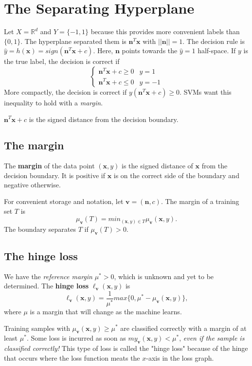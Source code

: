 \documentclass[titlepage, 12pt, leqno]{article}
\begin{document}
\pagebreak
\section{The Separating Hyperplane}
Let $X = \mathbb{R}^{d}$ and $Y = \{-1, 1\}$ because this provides more
convenient labels than $\{0,1\}$. The hyperplane separated them is 
$\textbf{n}^{T}\textbf{x}$ with $||\textbf{n}|| = 1$. The decision rule is
$\hat y = h(\textbf{x}) = sign(\textbf{n}^{T}\textbf{x} + c)$. Here, 
$\textbf{n}$ points towards the $\hat y=1$ half-space. If $y$ is the true
label, the decision is correct if
\[
\begin{cases}
    \textbf{n}^{T}\textbf{x} + c \ge 0 & y=1 \\
    \textbf{n}^{T}\textbf{x} + c \le 0 & y=-1
\end{cases}
\]
More compactly, the decision is correct if $y(\textbf{n}^{T}\textbf{x}+c)\ge 0$.
SVMs want this inequality to hold with a \textit{margin}.
\begin{note}
    $\textbf{n}^{T}\textbf{x} + c$ is the signed distance from the decision
    boundary.
\end{note}

\subsection{The margin}
\begin{definition}
    The \textbf{margin} of the data point $(\textbf{x}, y)$ is the signed
    distance of $\textbf{x}$ from the decision boundary. It is positive if
    $\textbf{x}$ is on the correct side of the boundary and negative otherwise.
\end{definition}
For convenient storage and notation, let $\textbf{v} = (\textbf{n}, c)$. The
margin of a training set $T$ is
\[
\mu_{\textbf{v}}(T) = min_{(\textbf{x}, y)\in T}\mu_{\textbf{v}}(\textbf{x},y).
\]
The boundary separates $T$ if $\mu_{\textbf{v}}(T) > 0$.

\subsection{The hinge loss}
We have the \textit{reference margin} $\mu^{*}>0$, which is unknown and yet to
be determined. The \textbf{hinge loss} $\ell_{\textbf{v}}(\textbf{x},y)$ is
\[
\ell_{\textbf{v}}(\textbf{x},y) = \frac{1}{\mu^{*}}max\{0, \mu^{*}-
\mu_{\textbf{v}}(\textbf{x},y)\},
\]
where $\mu$ is a margin that will change as the machine learns.

Training samples with $\mu_{\textbf{v}}(\textbf{x},y)\ge \mu^{*}$ are
classified correctly with a margin of at least $\mu^{*}$. Some loss is
incurred as soon as $my_{\textbf{v}}(\textbf{x},y) < \mu^{*}$, \textit{even if
the sample is classified correctly!} This type of loss is called the "hinge 
loss" because of the hinge that occurs where the loss function meats the 
$x$-axis in the loss graph.
\end{document}
